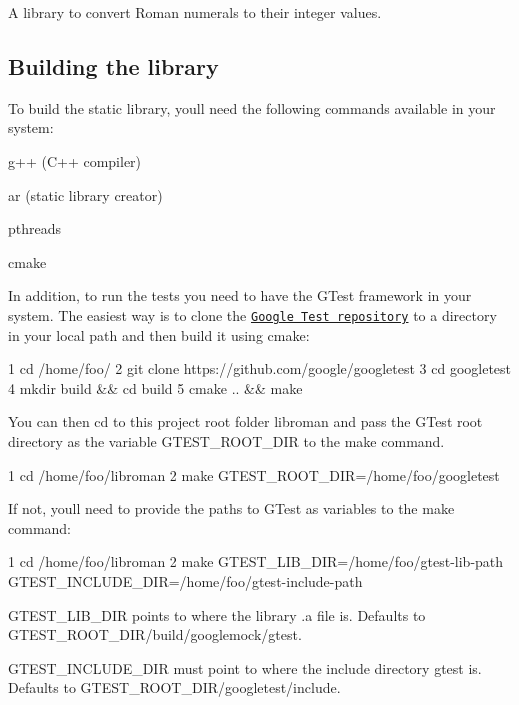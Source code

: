 A library to convert Roman numerals to their integer values.

\subsection*{Building the library }

To build the static library, you\textquotesingle{}ll need the following commands available in your system\+:


\begin{DoxyItemize}
\item {\ttfamily g++} (C++ compiler)
\item {\ttfamily ar} (static library creator)
\item {\ttfamily pthreads}
\item {\ttfamily cmake}
\end{DoxyItemize}

In addition, to run the tests you need to have the G\+Test framework in your system. The easiest way is to clone the \href{https://github.com/google/googletest}{\tt Google Test repository} to a directory in your local path and then build it using {\ttfamily cmake}\+:


\begin{DoxyCode}
1 cd /home/foo/
2 git clone https://github.com/google/googletest
3 cd googletest
4 mkdir build && cd build
5 cmake .. && make
\end{DoxyCode}


You can then {\ttfamily cd} to this project root folder {\ttfamily libroman} and pass the G\+Test root directory as the variable {\ttfamily G\+T\+E\+S\+T\+\_\+\+R\+O\+O\+T\+\_\+\+D\+IR} to the {\ttfamily make} command. 
\begin{DoxyCode}
1 cd /home/foo/libroman
2 make GTEST\_ROOT\_DIR=/home/foo/googletest
\end{DoxyCode}


If not, you\textquotesingle{}ll need to provide the paths to G\+Test as variables to the {\ttfamily make} command\+:


\begin{DoxyCode}
1 cd /home/foo/libroman
2 make GTEST\_LIB\_DIR=/home/foo/gtest-lib-path GTEST\_INCLUDE\_DIR=/home/foo/gtest-include-path
\end{DoxyCode}



\begin{DoxyItemize}
\item {\ttfamily G\+T\+E\+S\+T\+\_\+\+L\+I\+B\+\_\+\+D\+IR} points to where the library .a file is. Defaults to {\ttfamily G\+T\+E\+S\+T\+\_\+\+R\+O\+O\+T\+\_\+\+D\+I\+R/build/googlemock/gtest}.
\item {\ttfamily G\+T\+E\+S\+T\+\_\+\+I\+N\+C\+L\+U\+D\+E\+\_\+\+D\+IR} must point to where the include directory {\ttfamily gtest} is. {\ttfamily Defaults to G\+T\+E\+S\+T\+\_\+\+R\+O\+O\+T\+\_\+\+D\+I\+R/googletest/include}.
\end{DoxyItemize}

